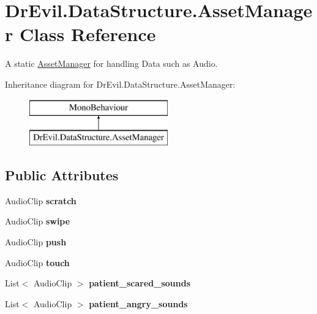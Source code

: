 \hypertarget{class_dr_evil_1_1_data_structure_1_1_asset_manager}{}\section{Dr\+Evil.\+Data\+Structure.\+Asset\+Manager Class Reference}
\label{class_dr_evil_1_1_data_structure_1_1_asset_manager}


A static \mbox{\hyperlink{class_dr_evil_1_1_data_structure_1_1_asset_manager}{Asset\+Manager}} for handling Data such as Audio.  


Inheritance diagram for Dr\+Evil.\+Data\+Structure.\+Asset\+Manager\+:\begin{figure}[H]
\begin{center}
\leavevmode
\includegraphics[height=2.000000cm]{class_dr_evil_1_1_data_structure_1_1_asset_manager}
\end{center}
\end{figure}
\subsection*{Public Attributes}
\begin{DoxyCompactItemize}
\item 
\mbox{\label{class_dr_evil_1_1_data_structure_1_1_asset_manager_a8fb69379890323598b0b2c9c18552f6a}} 
Audio\+Clip {\bfseries scratch}
\item 
\mbox{\label{class_dr_evil_1_1_data_structure_1_1_asset_manager_ac319353c9d6875c878ed96cdcb223ddc}} 
Audio\+Clip {\bfseries swipe}
\item 
\mbox{\label{class_dr_evil_1_1_data_structure_1_1_asset_manager_a00bda90d0d5c9f1d53009fbd1911973a}} 
Audio\+Clip {\bfseries push}
\item 
\mbox{\label{class_dr_evil_1_1_data_structure_1_1_asset_manager_abff01e46360a0429fb5cc8a5143f224b}} 
Audio\+Clip {\bfseries touch}
\item 
\mbox{\label{class_dr_evil_1_1_data_structure_1_1_asset_manager_a36fb40b17c5490381b55abc7b248b179}} 
List$<$ Audio\+Clip $>$ {\bfseries patient\+\_\+scared\+\_\+sounds}
\item 
\mbox{\label{class_dr_evil_1_1_data_structure_1_1_asset_manager_a3659d0e1c919ed88c3c278abc8960cd7}} 
List$<$ Audio\+Clip $>$ {\bfseries patient\+\_\+angry\+\_\+sounds}
\end{DoxyCompactItemize}
